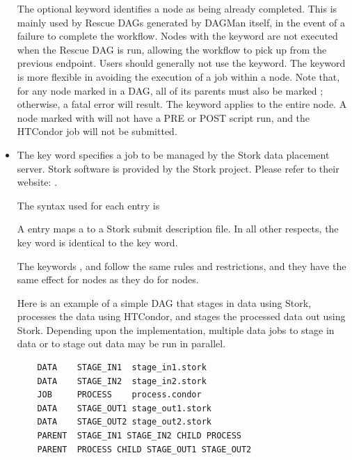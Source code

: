 \begin{itemize}
The optional  keyword identifies a node as being already
completed.
This is mainly used by Rescue DAGs generated by DAGMan itself,
in the event of a failure to complete the workflow.
Nodes with the  keyword are not executed when the Rescue DAG is run,
allowing the workflow to pick up from the previous endpoint.  Users
should generally not use the  keyword.
The  keyword is more flexible in avoiding
the execution of a job within a node.
Note that, for any node marked  in a DAG, all of
its parents must also be marked ; 
otherwise, a fatal error will result.
The  keyword applies to the entire node.
A node marked with  will not have a PRE or POST script run,
and the HTCondor job will not be submitted.

\label{dagman:DATA}
\item {}

The  key word specifies a job to be managed by the Stork data
placement server.  
Stork software is provided by the Stork project.
Please refer to their website: 
.

The syntax used for each  entry is

  
  

A  entry maps a  to a Stork submit description file.
In all other respects, the  key word is identical to the
 key word.

The keywords ,  and  
follow the same rules and restrictions, and they have the same effect
for  nodes as they do for  nodes.

Here is an example of a simple DAG that stages in data using Stork,
processes the data using HTCondor, 
and stages the processed data out using Stork.
Depending upon the implementation, multiple data jobs to stage in data
or to stage out data
may be run in parallel.

\footnotesize
\begin{verbatim}
    DATA    STAGE_IN1  stage_in1.stork
    DATA    STAGE_IN2  stage_in2.stork
    JOB     PROCESS    process.condor 
    DATA    STAGE_OUT1 stage_out1.stork
    DATA    STAGE_OUT2 stage_out2.stork
    PARENT  STAGE_IN1 STAGE_IN2 CHILD PROCESS
    PARENT  PROCESS CHILD STAGE_OUT1 STAGE_OUT2
\end{verbatim}
\normalsize


\end{itemize}
